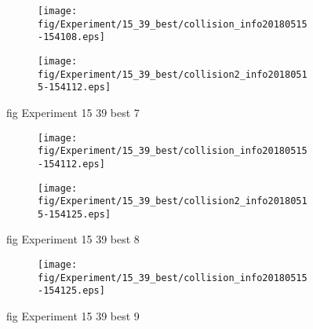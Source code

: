 \begin{figure}[H]
	\centering
	\begin{subfigure}[b]{0.9\textwidth}
		\texttt{[image: fig/Experiment/15\_39\_best/collision\_info20180515-154108.eps]}
		\caption{}
		\label{fig:Experiment:15_39_best:collision_info20180515-154108}
	\end{subfigure}

	\begin{subfigure}[b]{0.9\textwidth}
		\texttt{[image: fig/Experiment/15\_39\_best/collision2\_info20180515-154112.eps]}
		\caption{}
		\label{fig:Experiment:15_39_best:collision2_info20180515-154112}
	\end{subfigure}
	\caption{fig Experiment 15 39 best 7}
	\label{fig:Experiment:15_39_best:7}
\end{figure}

\begin{figure}[H]
	\centering
	\begin{subfigure}[b]{0.9\textwidth}
		\texttt{[image: fig/Experiment/15\_39\_best/collision\_info20180515-154112.eps]}
		\caption{}
		\label{fig:Experiment:15_39_best:collision_info20180515-154112}
	\end{subfigure}

	\begin{subfigure}[b]{0.9\textwidth}
		\texttt{[image: fig/Experiment/15\_39\_best/collision2\_info20180515-154125.eps]}
		\caption{}
		\label{fig:Experiment:15_39_best:collision2_info20180515-154125}
	\end{subfigure}
	\caption{fig Experiment 15 39 best 8}
	\label{fig:Experiment:15_39_best:8}
\end{figure}

\begin{figure}[H]
	\centering
	\begin{subfigure}[b]{0.9\textwidth}
		\texttt{[image: fig/Experiment/15\_39\_best/collision\_info20180515-154125.eps]}
		\caption{}
		\label{fig:Experiment:15_39_best:collision_info20180515-154125}
	\end{subfigure}
	\caption{fig Experiment 15 39 best 9}
	\label{fig:Experiment:15_39_best:9}
\end{figure}


